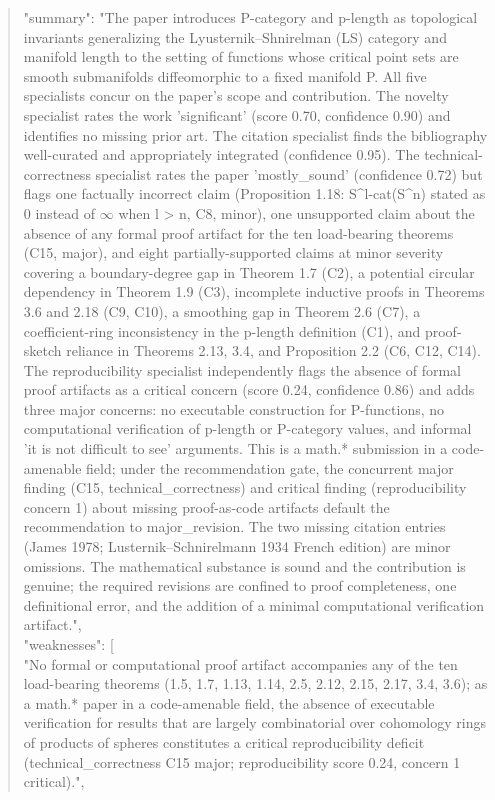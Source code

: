 \documentclass[11pt]{article}
\begin{document}
\begin{quote}
  "summary": "The paper introduces P-category and p-length as topological invariants generalizing the Lyusternik--Shnirelman (LS) category and manifold length to the setting of functions whose critical point sets are smooth submanifolds diffeomorphic to a fixed manifold P. All five specialists concur on the paper's scope and contribution. The novelty specialist rates the work 'significant' (score 0.70, confidence 0.90) and identifies no missing prior art. The citation specialist finds the bibliography well-curated and appropriately integrated (confidence 0.95). The technical-correctness specialist rates the paper 'mostly\_sound' (confidence 0.72) but flags one factually incorrect claim (Proposition 1.18: S\^{}l-cat(S\^{}n) stated as 0 instead of \ensuremath{\infty} when l > n, C8, minor), one unsupported claim about the absence of any formal proof artifact for the ten load-bearing theorems (C15, major), and eight partially-supported claims at minor severity covering a boundary-degree gap in Theorem 1.7 (C2), a potential circular dependency in Theorem 1.9 (C3), incomplete inductive proofs in Theorems 3.6 and 2.18 (C9, C10), a smoothing gap in Theorem 2.6 (C7), a coefficient-ring inconsistency in the p-length definition (C1), and proof-sketch reliance in Theorems 2.13, 3.4, and Proposition 2.2 (C6, C12, C14). The reproducibility specialist independently flags the absence of formal proof artifacts as a critical concern (score 0.24, confidence 0.86) and adds three major concerns: no executable construction for P-functions, no computational verification of p-length or P-category values, and informal 'it is not difficult to see' arguments. This is a math.* submission in a code-amenable field; under the recommendation gate, the concurrent major finding (C15, technical\_correctness) and critical finding (reproducibility concern 1) about missing proof-as-code artifacts default the recommendation to major\_revision. The two missing citation entries (James 1978; Lusternik--Schnirelmann 1934 French edition) are minor omissions. The mathematical substance is sound and the contribution is genuine; the required revisions are confined to proof completeness, one definitional error, and the addition of a minimal computational verification artifact.",\\
  "weaknesses": [\\
    "No formal or computational proof artifact accompanies any of the ten load-bearing theorems (1.5, 1.7, 1.13, 1.14, 2.5, 2.12, 2.15, 2.17, 3.4, 3.6); as a math.* paper in a code-amenable field, the absence of executable verification for results that are largely combinatorial over cohomology rings of products of spheres constitutes a critical reproducibility deficit (technical\_correctness C15 major; reproducibility score 0.24, concern 1 critical).",\\

\end{quote}
\end{document}
